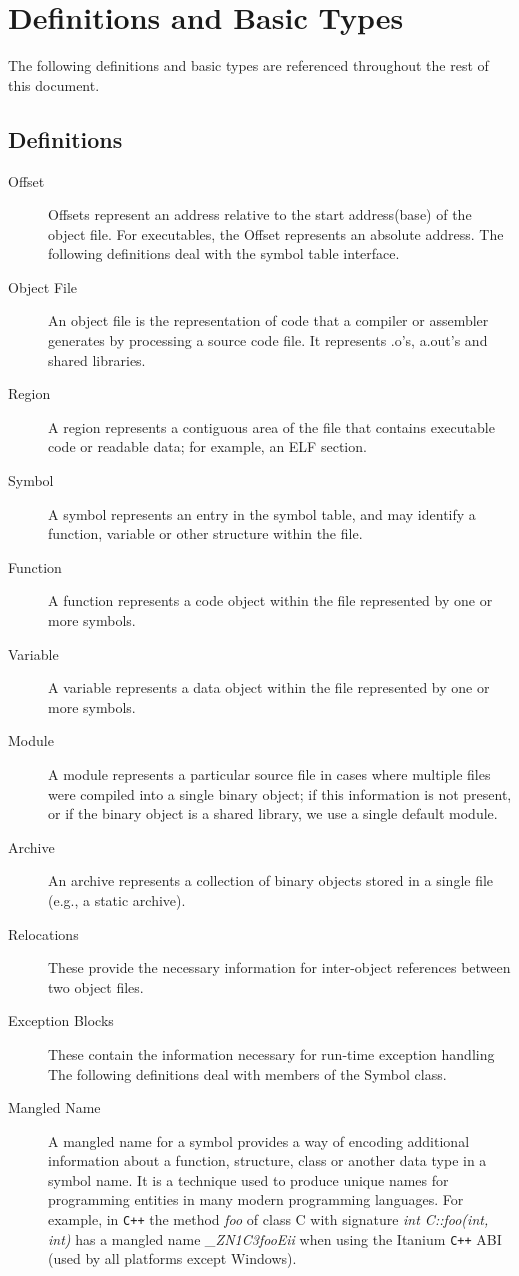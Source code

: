 \section{Definitions and Basic Types}

The following definitions and basic types are referenced throughout the rest of this document.

\subsection{Definitions}

\begin{description}
\item[Offset] Offsets represent an address relative to the start address(base) of the object file. For executables, the Offset represents an absolute address.
The following definitions deal with the symbol table interface.
\item[Object File] An object file is the representation of code that a compiler or assembler generates by processing a source code file. It represents .o's, a.out's and shared libraries.
\item[Region] A region represents a contiguous area of the file that contains executable code or readable data; for example, an ELF section.
\item[Symbol] A symbol represents an entry in the symbol table, and may identify a function, variable or other structure within the file.
\item[Function] A function represents a code object within the file represented by one or more symbols.
\item[Variable] A variable represents a data object within the file represented by one or more symbols.
\item[Module] A module represents a particular source file in cases where multiple files were compiled into a single binary object; if this information is not present, or if the binary object is a shared library, we use a single default module.
\item[Archive] An archive represents a collection of binary objects stored in a single file (e.g., a static archive).
\item[Relocations] These provide the necessary information for inter-object references between two object files.
\item[Exception Blocks] These contain the information necessary for run-time exception handling
The following definitions deal with members of the Symbol class.
\item[Mangled Name] A mangled name for a symbol provides a way of encoding additional information about a function, structure, class or another data type in a symbol name.
It is a technique used to produce unique names for programming entities in many modern programming languages.
For example, in \verb!C++! the method \emph{foo} of class C with signature \emph{int C::foo(int, int)} has a mangled name \emph{\_ZN1C3fooEii} when using the Itanium \verb!C++! ABI (used by all platforms except Windows).


\end{description}
